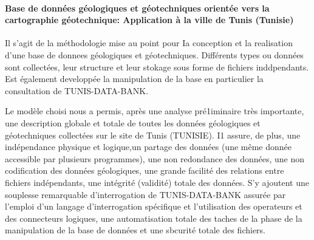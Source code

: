             \paragraph{Base de données géologiques et géotechniques orientée vers la cartographie géotechnique: Application à la ville de Tunis (Tunisie)}
            Il s'agit de la méthodologie mise au point pour Ia conception et la realisation d'une base de donnees géologiques et géotechniques.
            Différents types ou données  sont collectées, leur structure et leur stokage sous forme de fichiers inddpendants. Est également
            developpée la manipulation de la base en particulier la consultation de TUNIS-DATA-BANK.
            \par
            Le modèle choisi nous a permis, après une analyse
pré1iminaire très importante, une description globale et
totale de toutes les données géologiques et géotechniques collectées sur le site de Tunis (TUNISIE). I1
assure, de plus, une indépendance physique et logique,un partage des données (une même donnée accessible  par plusieurs programmes), une non redondance des données, une non codification des
données géologiques, une grande facilité des relations
entre fichiers indépendants, une intégrité (validité)
totale des données. S'y ajoutent une souplesse remarquable d'interrogation de TUNIS-DATA-BANK
assurée par l'emploi d'un langage d'interrogation spécifique et l'utilisation des operateurs et des connecteurs
logiques, une automatisation totale des taches de la
phase de la manipulation de la base de données et une
sbcurité totale des fichiers.
\cite{tunis}

